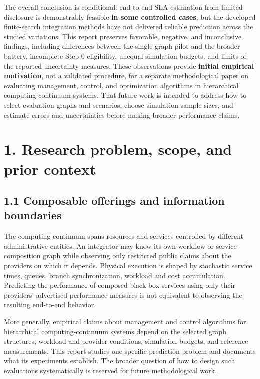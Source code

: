 \documentclass[10pt,a4paper]{article}
\begin{document}
The overall conclusion is conditional: end-to-end SLA estimation from limited disclosure is demonstrably feasible \textbf{in some controlled cases}, but the developed finite-search integration methods have not delivered reliable prediction across the studied variations. This report preserves favorable, negative, and inconclusive findings, including differences between the single-graph pilot and the broader battery, incomplete Step-0 eligibility, unequal simulation budgets, and limits of the reported uncertainty measures. These observations provide \textbf{initial empirical motivation}, not a validated procedure, for a separate methodological paper on evaluating management, control, and optimization algorithms in hierarchical computing-continuum systems. That future work is intended to address how to select evaluation graphs and scenarios, choose simulation sample sizes, and estimate errors and uncertainties before making broader performance claims.

\section*{1. Research problem, scope, and prior context}

\subsection*{1.1 Composable offerings and information boundaries}

The computing continuum spans resources and services controlled by different administrative entities. An integrator may know its own workflow or service-composition graph while observing only restricted public claims about the providers on which it depends. Physical execution is shaped by stochastic service times, queues, branch synchronization, workload and cost accumulation. Predicting the performance of composed black-box services using only their providers' advertised performance measures is not equivalent to observing the resulting end-to-end behavior.

More generally, empirical claims about management and control algorithms for hierarchical computing-continuum systems depend on the selected graph structures, workload and provider conditions, simulation budgets, and reference measurements. This report studies one specific prediction problem and documents what its experiments establish. The broader question of how to design such evaluations systematically is reserved for future methodological work.
\end{document}

